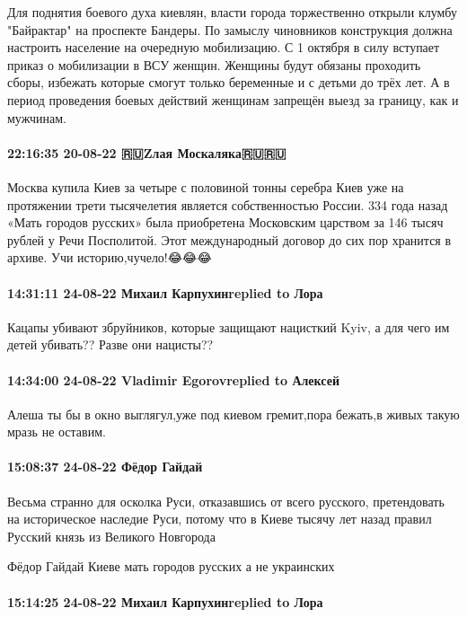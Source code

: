 Для поднятия боевого духа киевлян, власти города торжественно открыли клумбу
"Байрактар" на проспекте Бандеры. По замыслу чиновников конструкция должна
настроить население на очередную мобилизацию. С 1 октября в силу вступает
приказ о мобилизации в ВСУ женщин. Женщины будут обязаны проходить сборы,
избежать которые смогут только беременные и с детьми до трёх лет. А в период
проведения боевых действий женщинам запрещён выезд за границу, как и мужчинам.

\paragraph{22:16:35 20-08-22 🇷🇺Zлая Москаляка🇷🇺🇷🇺}

Москва купила Киев за четыре с половиной тонны серебра
Киев уже на протяжении трети тысячелетия является собственностью России. 334 года назад «Мать городов русских» была приобретена Московским царством за 146 тысяч рублей у Речи Посполитой. Этот международный договор до сих пор хранится в архиве.
Учи историю,чучело!😂😂😂

\paragraph{14:31:11 24-08-22 Михаил Карпухинreplied to Лора}

Кацапы убивают збруйников, которые защищают нацисткий Kyiv, а для чего им детей
убивать?? Разве они нацисты??

\paragraph{14:34:00 24-08-22 Vladimir Egorovreplied to Алексей}

Алеша ты бы в окно выглягул,уже под киевом гремит,пора бежать,в живых такую
мразь не оставим.

\paragraph{15:08:37 24-08-22 Фёдор Гайдай}

Весьма странно для осколка Руси, отказавшись от всего русского, претендовать на
историческое наследие Руси, потому что в Киеве тысячу лет назад правил Русский
князь из Великого Новгорода

Фёдор Гайдай
Киеве мать городов русских а не украинских

\paragraph{15:14:25 24-08-22 Михаил Карпухинreplied to Лора}

